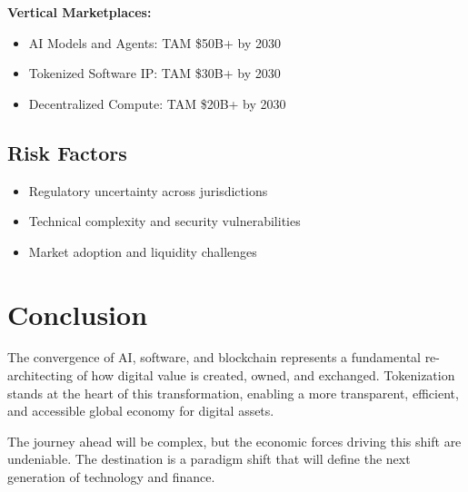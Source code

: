\documentclass[11pt,a4paper]{report}
\begin{document}
\textbf{Vertical Marketplaces:}
\begin{itemize}
    \item AI Models and Agents: TAM \$50B+ by 2030
    \item Tokenized Software IP: TAM \$30B+ by 2030
    \item Decentralized Compute: TAM \$20B+ by 2030
\end{itemize}

\section{Risk Factors}
\begin{itemize}
    \item Regulatory uncertainty across jurisdictions
    \item Technical complexity and security vulnerabilities
    \item Market adoption and liquidity challenges
\end{itemize}

\chapter*{Conclusion}

The convergence of AI, software, and blockchain represents a fundamental re-architecting of how digital value is created, owned, and exchanged. Tokenization stands at the heart of this transformation, enabling a more transparent, efficient, and accessible global economy for digital assets.

The journey ahead will be complex, but the economic forces driving this shift are undeniable. The destination is a paradigm shift that will define the next generation of technology and finance.
\end{document}
